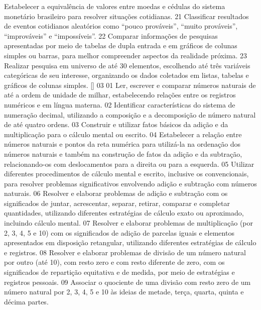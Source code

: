{{{{					Estabelecer a equivalência de valores entre moedas e cédulas do sistema
					monetário brasileiro para resolver situações cotidianas.
				}
				{21}{%
					Classificar resultados de eventos cotidianos aleatórios como “pouco prováveis”,
					“muito prováveis”, “improváveis” e “impossíveis”.
				}
				{22}{%
					Comparar informações de pesquisas apresentadas por meio de tabelas de dupla
					entrada e em gráficos de colunas simples ou barras, para melhor compreender aspectos da
					realidade próxima.
				}
				{23}{%
					Realizar pesquisa em universo de até 30 elementos, escolhendo até três variáveis
					categóricas de seu interesse, organizando os dados coletados em listas, tabelas e gráficos de
					colunas simples.
				}
		}[\la@invalidefhability]
	}
	{03}{%
		{01}{%
				Ler, escrever e comparar números naturais de até a ordem de unidade de milhar,
				estabelecendo relações entre os registros numéricos e em língua materna.
			}
			{02}{%
				Identificar características do sistema de numeração decimal, utilizando a
				composição e a decomposição de número natural de até quatro ordens.
			}
			{03}{%
				Construir e utilizar fatos básicos da adição e da multiplicação para o cálculo
				mental ou escrito.
			}
			{04}{%
				Estabelecer a relação entre números naturais e pontos da reta numérica para
				utilizá-la na ordenação dos números naturais e também na construção de fatos da adição e da
				subtração, relacionando-os com deslocamentos para a direita ou para a esquerda.
			}
			{05}{%
				Utilizar diferentes procedimentos de cálculo mental e escrito, inclusive os
				convencionais, para resolver problemas significativos envolvendo adição e subtração com
				números naturais.
			}
			{06}{%
				Resolver e elaborar problemas de adição e subtração com os significados de
				juntar, acrescentar, separar, retirar, comparar e completar quantidades, utilizando diferentes
				estratégias de cálculo exato ou aproximado, incluindo cálculo mental.
			}
			{07}{%
				Resolver e elaborar problemas de multiplicação (por 2, 3, 4, 5 e 10) com os
				significados de adição de parcelas iguais e elementos apresentados em disposição retangular,
				utilizando diferentes estratégias de cálculo e registros.
			}
			{08}{%
				Resolver e elaborar problemas de divisão de um número natural por outro (até
				10), com resto zero e com resto diferente de zero, com os significados de repartição equitativa
				e de medida, por meio de estratégias e registros pessoais.
			}
			{09}{%
				Associar o quociente de uma divisão com resto zero de um número natural por 2,
				3, 4, 5 e 10 às ideias de metade, terça, quarta, quinta e décima partes.
}}}
